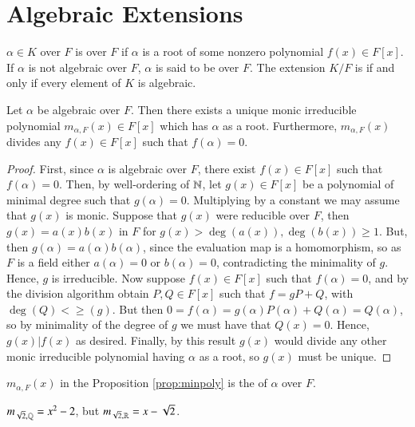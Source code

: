 \documentclass[12pt, a4paper, oneside, openright, titlepage]{book}
\begin{document}
\section{\textsection Algebraic Extensions}

\begin{defn}
    $\alpha \in K$ over $F$ is  over $F$ if $\alpha$ is a root of some nonzero polynomial $f(x) \in F[x]$. If $\alpha$ is not algebraic over $F$, $\alpha$ is said to be  over $F$. The extension $K/F$ is  if and only if every element of $K$ is algebraic.
\end{defn}


\begin{prop}\label{prop:minpoly}
    Let $\alpha$ be algebraic over $F$. Then there exists a unique monic irreducible polynomial $m_{\alpha,F}(x) \in F[x]$ which has $\alpha$ as a root. Furthermore, $m_{\alpha,F}(x)$ divides any $f(x) \in F[x]$ such that $f(\alpha) = 0$.
\end{prop}
\begin{proof}
    First, since $\alpha$ is algebraic over $F$, there exist $f(x) \in F[x]$ such that $f(\alpha) = 0$. Then, by well-ordering of $\mathbb N$, let $g(x) \in F[x]$ be a polynomial of minimal degree such that $g(\alpha) = 0$. Multiplying by a constant we may assume that $g(x)$ is monic. Suppose that $g(x)$ were reducible over $F$, then $g(x) = a(x)b(x)$ in $F$ for $g(x) > \deg(a(x)),\deg(b(x)) \geq 1$. But, then $g(\alpha) = a(\alpha)b(\alpha)$, since the evaluation map is a homomorphism, so as $F$ is a field either $a(\alpha) = 0$ or $b(\alpha) = 0$, contradicting the minimality of $g$. Hence, $g$ is irreducible. Now suppose $f(x) \in F[x]$ such that $f(\alpha) = 0$, and by the division algorithm obtain $P,Q \in F[x]$ such that $f = gP+Q$, with $\deg(Q) < \geq (g)$. But then $0=f(\alpha)=g(\alpha)P(\alpha)+Q(\alpha)=Q(\alpha)$, so by minimality of the degree of $g$ we must have that $Q(x) = 0$. Hence, $g(x)\vert f(x)$ as desired. Finally, by this result $g(x)$ would divide any other monic irreducible polynomial having $\alpha$ as a root, so $g(x)$ must be unique.
\end{proof}



\begin{defn}
    $m_{\alpha,F}(x)$ in the Proposition \ref{prop:minpoly} is the  of $\alpha$ over $F$.
\end{defn}


\begin{eg}
    $m_{\sqrt{2},\mathbb Q} = x^2-2$, but $m_{\sqrt{2},\mathbb R} = x-\sqrt{2}$.
\end{eg}
\end{document}
